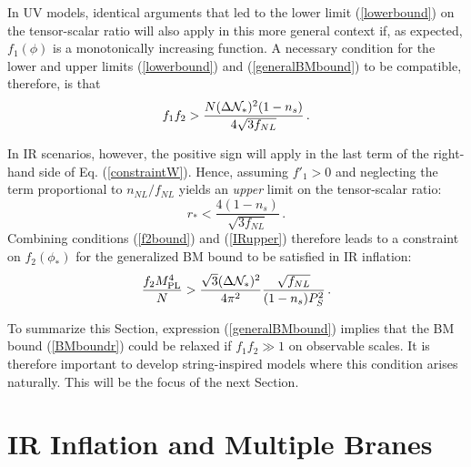 In UV models, identical arguments that led to 
the lower limit (\ref{lowerbound}) on the tensor-scalar ratio
will also apply in this more general context if, as expected, $f_1 (\phi) $ 
is a monotonically increasing function. A necessary condition for
the lower and upper limits
(\ref{lowerbound}) and (\ref{generalBMbound}) to be compatible, therefore, is  
that  
\begin{equation}
\label{evade}
f_1f_2 > \frac{N (\Delta {\cal{N}}_*)^2 (1-n_s)}{4\sqrt{3f_{NL}}} \,.
\end{equation}

In IR scenarios, however, the positive sign will apply in the 
last term of the right-hand side of Eq. (\ref{constraintW}).
Hence, assuming $f'_1 >0$ and neglecting the term proportional to 
$n_{NL}/f_{NL}$ yields an {\em upper} limit on the tensor-scalar ratio:
\begin{equation}
\label{IRupper}
r_* < \frac{4(1-n_s)}{\sqrt{3f_{NL}}}  \,.
\end{equation}
Combining conditions (\ref{f2bound}) and (\ref{IRupper}) 
therefore leads to a constraint on $f_2 (\phi_*) $
for the generalized BM bound to be satisfied in IR inflation: 
\begin{equation}
\label{f2IRlolwer}
\frac{f_2M_{\mathrm{PL}}^4}{N} > \frac{\sqrt{3} (\Delta {\cal{N}}_*)^2}{4\pi^2}
\frac{\sqrt{f_{NL}}}{(1-n_s)P_S^2}  \,.
\end{equation}

To summarize this Section, 
expression (\ref{generalBMbound}) implies that the 
BM bound (\ref{BMboundr}) 
could be relaxed if $f_1f_2 \gg 1$ on observable scales. 
It is therefore important to develop string-inspired models 
where this condition arises naturally. This will be the focus of the 
next Section.
% 
% 
% 
% 
\section{IR Inflation and Multiple Branes}
% 
\label{sec:multiple}


